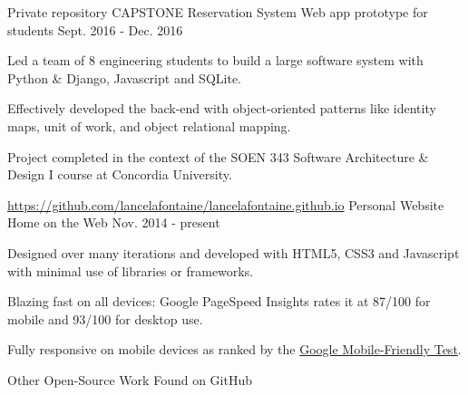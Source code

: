 \begin{cventries}
  \cventry
  {\small Private repository} %
  {\normalsize CAPSTONE Reservation System} %
    {\small Web app prototype for students} %
    {\small Sept. 2016 - Dec. 2016} %
    {
      \begin{cvitems} %
      \item \small Led a team of 8 engineering students to build a large software system with Python \& Django, Javascript and SQLite.
        \item Effectively developed the back-end with object-oriented patterns like identity maps, unit of work, and object relational mapping.
      \item \small Project completed in the context of the SOEN 343 Software Architecture \& Design I course at Concordia University.
      \end{cvitems}
    }

  \cventry
  {\small \href{https://github.com/lancelafontaine/lancelafontaine.github.io}{https://github.com/lancelafontaine/lancelafontaine.github.io}} %
  {\normalsize Personal Website} %
    {\small Home on the Web} %
    {\small Nov. 2014 - present} %
    {
      \begin{cvitems} %
      \item \small Designed over many iterations and developed with HTML5, CSS3 and Javascript with minimal use of libraries or frameworks.
      \item \small Blazing fast on all devices: Google PageSpeed Insights rates it at 87/100 for mobile and 93/100 for desktop use.
      \item \small Fully responsive on mobile devices as ranked by the \href{https://search.google.com/search-console/mobile-friendly}{Google Mobile-Friendly Test}.
      \end{cvitems}
    }

  \cventry
  {} %
  {\normalsize Other Open-Source Work} %
  {\small Found on GitHub} %
    {\small } %
    {}

    \vspace{-12mm}


\end{cventries}
